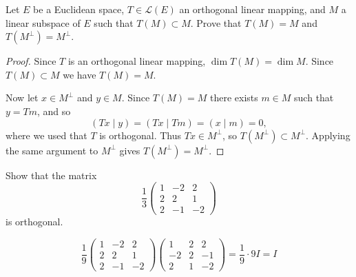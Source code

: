 \begin{tcolorbox}[title=Problem 7, breakable]
Let $E$ be a Euclidean space, $T \in \mathcal{L}(E)$ an orthogonal linear mapping, and $M$ a linear subspace of $E$ such that $T(M) \subset M$. Prove that $T(M) = M$ and $T(M^\perp) = M^\perp$.
\end{tcolorbox}

\begin{proof}
    Since $T$ is an orthogonal linear mapping, $\dim T(M) = \dim M$.
    Since $T(M) \subset M$ we have $T(M) = M$.

    Now let $x \in M^\perp$ and $y \in M$. Since $T(M) = M$ there exists $m \in M$ such that $y = Tm$, and so
    \[(Tx \mid y) = (Tx \mid Tm) = (x \mid m) = 0,\]
    where we used that $T$ is orthogonal. Thus $Tx \in M^\perp$, so $T(M^\perp) \subset M^\perp$.
    Applying the same argument to $M^\perp$ gives $T(M^\perp) = M^\perp$.
\end{proof}

\begin{tcolorbox}[title=Problem 8, breakable]
Show that the matrix
\[\frac{1}{3}\begin{pmatrix} 1 & -2 & 2 \\ 2 & 2 & 1 \\ 2 & -1 & -2 \end{pmatrix}\]
is orthogonal.
\end{tcolorbox}

\[\frac{1}{9}\begin{pmatrix}1&-2&2\\2&2&1\\2&-1&-2\end{pmatrix}\begin{pmatrix}1&2&2\\-2&2&-1\\2&1&-2\end{pmatrix} = \frac{1}{9}\cdot 9I = I\]


